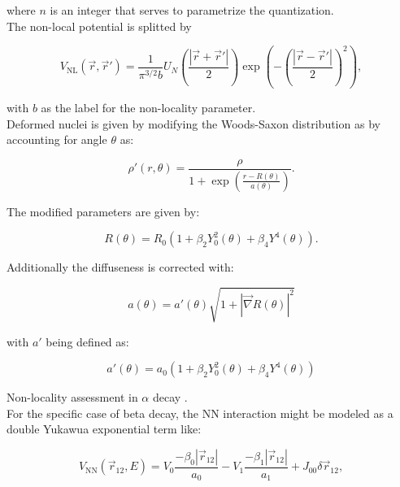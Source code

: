 \documentclass[openany]{book}
\begin{document}
where $n$ is an integer that serves to parametrize the quantization. \\

The non-local potential is splitted by 

\begin{equation}\label{potential_nonLocal_gaussian}
	V_{\mathrm{NL}} (\vec r, \vec r') = \frac{1}{\pi^{3/2}b} U_N \left( \frac{|\vec r + \vec r'|}{2}\right) \exp \left(- \left( \frac{|\vec r - \vec r'|}{2}\right)^2\right),
\end{equation}

with $b$ as the label for the non-locality parameter.\\

Deformed nuclei is given by modifying the Woods-Saxon distribution as by accounting for angle $\theta$ as:


 \begin{equation}\label{potential_nonLocal_modifiedWoodsSaxon}
 	\rho'(r, \theta) = \frac{\rho }{1+\exp{\left(\frac{r-R(\theta)}{a(\theta)}\right)}}.
 \end{equation}
 
The modified parameters are given by:

 \begin{equation}\label{potential_nonLocal_modifiedWoodsSaxon_r}
	R(\theta) = R_0(1 + \beta_2 Y^{2}_{0}(\theta) + \beta_4Y^{4}(\theta)).
\end{equation}

Additionally the diffuseness is corrected with:

 \begin{equation}\label{potential_nonLocal_modifiedWoodsSaxon_a}
	a(\theta) = a'(\theta) \sqrt{1 + |\vec \nabla R(\theta)|^2 }
\end{equation}

with $a'$ being defined as:

 \begin{equation}\label{potential_nonLocal_modifiedWoodsSaxon_aprime}
	a'(\theta) = a_0 \left(1 + \beta_2 Y^{2}_{0}(\theta) + \beta_4Y^{4}(\theta)\right)
\end{equation}

Non-locality assessment in $\alpha$ decay \cite{perez_velasquez_kelkar_upadhyay_2019}. \\

For the specific case of beta decay, the NN interaction might be modeled as a double Yukawua exponential term like: 

\begin{equation}\label{potential_nonLocal_M3Y}
	V_{\mathrm{NN}}(\vec r_{12}, E) = V_0 \frac{-\beta_0 |\vec r_{12}|}{a_0} - V_1 \frac{-\beta_1 |\vec r_{12}|}{a_1} + J_{00}\delta{\vec r_{12}},
\end{equation}
\end{document}
